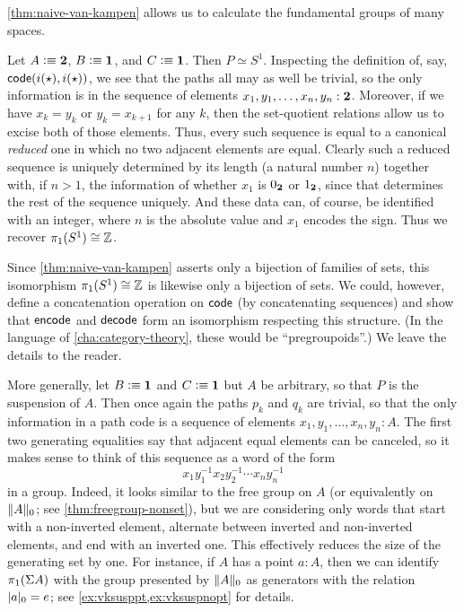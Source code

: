 \autoref{thm:naive-van-kampen} allows us to calculate the fundamental groups of many spaces.

\begin{eg}\label{eg:circle}
  Let $A\defeq \bool$, $B\defeq\unit$, and $C\defeq \unit$.
  Then $P \simeq S^1$.
  Inspecting the definition of, say, $\code(i(\ttt),i(\ttt))$, we see that the paths all may as well be trivial, so the only information is in the sequence of elements $x_1,y_1,\dots,x_n,y_n: \bool$.
  Moreover, if we have $x_k=y_k$ or $y_k=x_{k+1}$ for any $k$, then the set-quotient relations allow us to excise both of those elements.
  Thus, every such sequence is equal to a canonical \emph{reduced} one in which no two adjacent elements are equal.
  Clearly such a reduced sequence is uniquely determined by its length (a natural number $n$) together with, if $n>1$, the information of whether $x_1$ is $\bfalse$ or $\btrue$, since that determines the rest of the sequence uniquely.
  And these data can, of course, be identified with an integer, where $n$ is the absolute value and $x_1$ encodes the sign.
  Thus we recover $\pi_1(S^1)\cong \Z$.
\end{eg}

Since \autoref{thm:naive-van-kampen} asserts only a bijection of families of sets, this isomorphism $\pi_1(S^1)\cong \Z$ is likewise only a bijection of sets.
We could, however, define a concatenation operation on $\code$ (by concatenating sequences) and show that $\encode$ and $\decode$ form an isomorphism respecting this structure.
(In the language of \autoref{cha:category-theory}, these would be ``pregroupoids''.)
We leave the details to the reader.

\begin{eg}\label{eg:suspension}
  More generally, let $B\defeq\unit$ and $C\defeq \unit$ but $A$ be arbitrary, so that $P$ is the suspension of $A$.
  Then once again the paths $p_k$ and $q_k$ are trivial, so that the only information in a path code is a sequence of elements $x_1,y_1,\dots,x_n,y_n: A$.
  The first two generating equalities say that adjacent equal elements can be canceled, so it makes sense to think of this sequence as a word of the form
  \[ x_1 y_1^{-1} x_2 y_2^{-1} \cdots x_n y_n^{-1} \]
  in a group.
  Indeed, it looks similar to the free group on $A$ (or equivalently on $\trunc0A$; see \autoref{thm:freegroup-nonset}), but we are considering only words that start with a non-inverted element, alternate between inverted and non-inverted elements, and end with an inverted one.
  This effectively reduces the size of the generating set by one.
  For instance, if $A$ has a point $a:A$, then we can identify $\pi_1(\susp A)$ with the group presented by $\trunc0A$ as generators with the relation $\tproj0a = e$; see \autoref{ex:vksusppt,ex:vksuspnopt} for details.
\end{eg}

